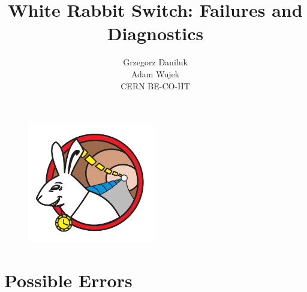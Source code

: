 \documentclass[a4paper, 12pt]{article}
\begin{document}
\setcounter{tocdepth}{2}

\title{White Rabbit Switch: Failures and Diagnostics}
\author{Grzegorz Daniluk\\ Adam Wujek\\[.5cm] CERN BE-CO-HT\\ \small{\gitrevinfo}}
\maketitle
\thispagestyle{empty}

\begin{figure}[ht!]
  \centering
  \vspace{1.3cm}
  \includegraphics[width=0.50\textwidth]{../images/WRlogo.pdf}
\end{figure}

\newpage

\newpage

\newpage

\tableofcontents

\newpage


\newpage
\section{Possible Errors}
\label{sec:failures}

\newpage


%
%
\end{document}
